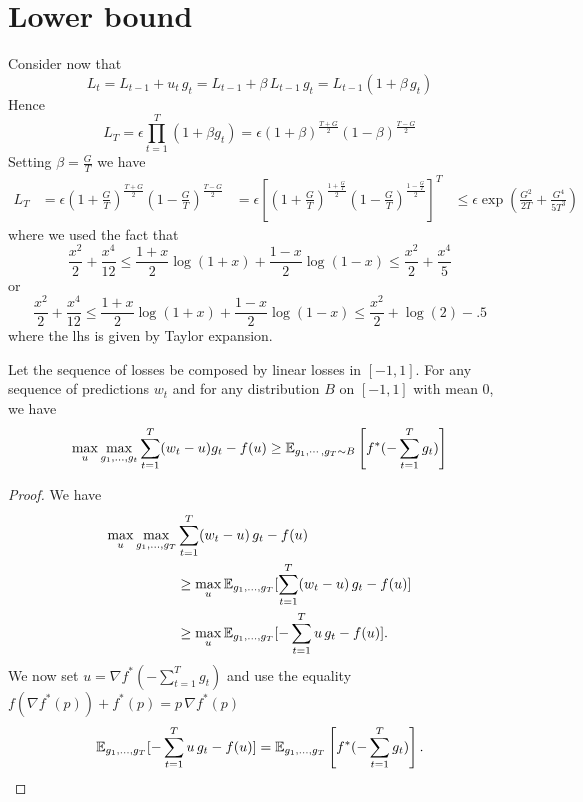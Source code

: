 \section{Lower bound}

Consider now that
\[
L_t=L_{t-1} + u_t \, g_t = L_{t-1} + \beta \, L_{t-1} \, g_t = L_{t-1} (1+\beta \, g_t)
\]
Hence
\[
L_T=\epsilon \prod_{t=1}^T (1+\beta g_t) = \epsilon (1+\beta)^\frac{T+G}{2} (1-\beta)^\frac{T-G}{2}
\]
Setting $\beta=\frac{G}{T}$ we have
\begin{align}
L_T &= \epsilon (1+\frac{G}{T})^\frac{T+G}{2} (1-\frac{G}{T})^\frac{T-G}{2} 
&= \epsilon \left[(1+\frac{G}{T})^\frac{1+\frac{G}{T}}{2} (1-\frac{G}{T})^\frac{1-\frac{G}{T}}{2}\right]^T 
&\leq \epsilon \exp \left(\frac{G^2}{2 T} + \frac{G^4}{5 T^3}\right)
\end{align}
where we used the fact that
\[
\frac{x^2}{2} +\frac{x^4}{12}\leq \frac{1+x}{2} \log(1+x) + \frac{1-x}{2}\log(1-x) \leq \frac{x^2}{2} + \frac{x^4}{5}
\]
or 
\[
\frac{x^2}{2} +\frac{x^4}{12}\leq \frac{1+x}{2} \log(1+x) + \frac{1-x}{2}\log(1-x) \leq \frac{x^2}{2} + \log(2)-.5
\]
where the lhs is given by Taylor expansion.



\begin{theorem}
Let the sequence of losses be composed by linear losses in $[-1,1]$. For any sequence of predictions $w_t$ and 
for any distribution $B$ on $[-1,1]$ with mean 0, we have 
\[
\max_u \max_{g_1, \ldots, g_t} \sum_{t=1}^T (w_t-u) g_t - f(u) \geq \mathbb{E}_{g_1, \cdots, g_T \sim B} \left[f^*(-\sum_{t=1}^T g_t)\right]
\]
\end{theorem}
\begin{proof}
We have
\begin{align}
\max_u \max_{g_1,\ldots,g_T} &\sum_{t=1}^T (w_t - u) \, g_t -f(u)\\
&\geq \max_u \mathbb{E}_{g_1,\ldots,g_T} [\sum_{t=1}^T (w_t - u) \, g_t -f(u)]\\
&\geq \max_u \mathbb{E}_{g_1,\ldots,g_T} [-\sum_{t=1}^T u \, g_t -f(u)].
\end{align}
We now set $u=\nabla f^*(-\sum_{t=1}^T g_t)$ and use the equality $f(\nabla f^*(p) ) + f^*(p) = p\, \nabla f^*(p)$
\[
\mathbb{E}_{g_1,\ldots,g_T} [-\sum_{t=1}^T u \, g_t -f(u)] = \mathbb{E}_{g_1,\ldots,g_T} \left[f^*(-\sum_{t=1}^T g_t)\right].
\]
\end{proof}

